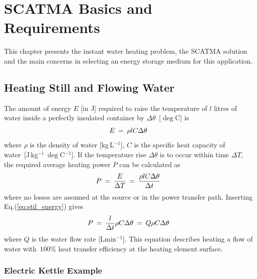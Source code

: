 
\chapter{\textbf{SCATMA Basics and Requirements}}
\label{ch:basics}

This chapter presents the instant water heating problem, the SCATMA solution and the main concerns in selecting an energy storage medium for this application. 

\section{Heating Still and Flowing Water}

The amount of energy $E$ [in J] required to raise the temperature of $l$ litres of water inside a perfectly insulated container by $\Delta\theta$~[$\deg$C] is 
%
\begin{equation}
\label{eq:stil_energy}
  E\:=\:\rho lC\Delta\theta
\end{equation}
%
where $\rho$ is the density of water [kg\,L$^{-1}$], $C$ is the specific heat capacity of water~[J\,kg$^{-1}$\,$\deg$C$^{-1}$].
If the temperature rise $\Delta\theta$ is to occur within time $\Delta T$, the required average heating power $P$ can be calculated as
%
\begin{equation}
\label{eq:still_power}
    P\:=\:\frac{E}{\Delta T}\:=\:\frac{\rho lC\Delta\theta}{\Delta t} 
\end{equation}
%
where no losses are assumed at the source or in the power transfer path.
Inserting Eq.(\ref{eq:stil_energy}) gives
%
\begin{equation}
\label{eq:still_power_rearrange}
P\:=\:\frac{l}{\Delta t}\rho C\Delta\theta\:=\: Q\rho C\Delta\theta
\end{equation}
%
where $Q$ is the water flow rate [Lmin$^{-1}$]. This equation describes heating a flow of water with~$100\%$ heat transfer efficiency at the heating element surface.
%




\subsection{Electric Kettle Example}


